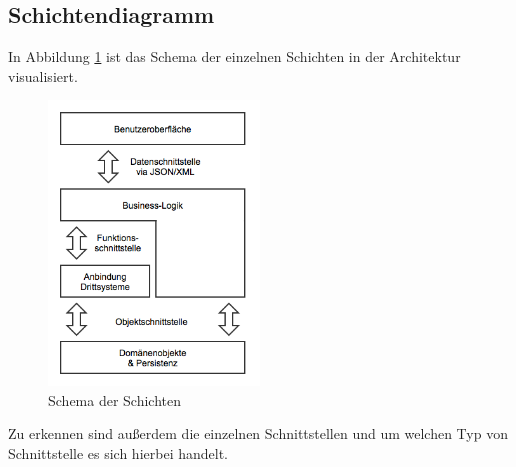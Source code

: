 \documentclass[a4paper,12pt]{article} %
\begin{document}
\subsection{Schichtendiagramm}
In Abbildung \ref{fig:architektur} ist das Schema der einzelnen Schichten in der Architektur visualisiert.
\begin{figure}[H]
	\centering
	\includegraphics[width=0.5\textwidth]{img/architektur.png}
	\caption{Schema der Schichten}
	\label{fig:architektur}
\end{figure}
Zu erkennen sind außerdem die einzelnen Schnittstellen und um welchen Typ von Schnittstelle es sich hierbei handelt.

\newpage
\newpage
{}
{}
\listoffigures



%
%
\end{document}
